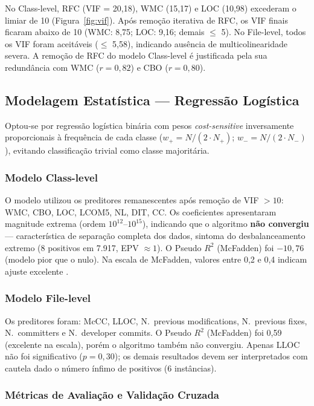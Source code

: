 \documentclass[12pt]{article}
\begin{document}
No Class-level, RFC (VIF = 20,18), WMC (15,17) e LOC (10,98) excederam o limiar de 10 (Figura~\ref{fig:vif}). Após remoção iterativa de RFC, os VIF finais ficaram abaixo de 10 (WMC: 8,75; LOC: 9,16; demais $\leq$ 5). No File-level, todos os VIF foram aceitáveis ($\leq$ 5,58), indicando ausência de multicolinearidade severa. A remoção de RFC do modelo Class-level é justificada pela sua redundância com WMC ($r = 0{,}82$) e CBO ($r = 0{,}80$).

\subsection{Modelagem Estatística --- Regressão Logística}

Optou-se por regressão logística binária com pesos \textit{cost-sensitive} inversamente proporcionais à frequência de cada classe ($w_+ = N / (2 \cdot N_+)$; $w_- = N / (2 \cdot N_-)$), evitando classificação trivial como classe majoritária.

\subsubsection{Modelo Class-level}

O modelo utilizou os preditores remanescentes após remoção de VIF $> 10$: WMC, CBO, LOC, LCOM5, NL, DIT, CC. Os coeficientes apresentaram magnitude extrema (ordem $10^{12}$--$10^{15}$), indicando que o algoritmo \textbf{não convergiu} --- característica de separação completa dos dados, sintoma do desbalanceamento extremo (8 positivos em 7.917, EPV $\approx 1$). O Pseudo $R^2$ (McFadden) foi $-10{,}76$ (modelo pior que o nulo). Na escala de McFadden, valores entre 0,2 e 0,4 indicam ajuste excelente \cite{mcfadden1974}.

\subsubsection{Modelo File-level}

Os preditores foram: McCC, LLOC, N.\ previous modifications, N.\ previous fixes, N.\ committers e N.\ developer commits. O Pseudo $R^2$ (McFadden) foi 0,59 (excelente na escala), porém o algoritmo também não convergiu. Apenas LLOC não foi significativo ($p = 0{,}30$); os demais resultados devem ser interpretados com cautela dado o número ínfimo de positivos (6 instâncias).

\subsubsection{Métricas de Avaliação e Validação Cruzada}
\end{document}
